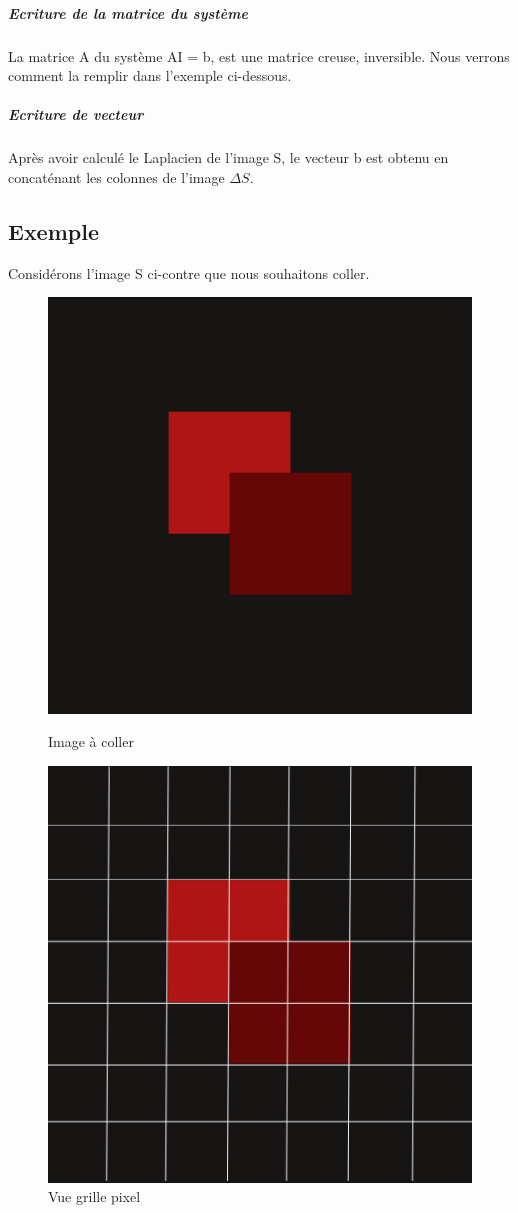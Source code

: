 \subparagraph{Ecriture de la matrice du système}
La matrice A du système AI = b, est une matrice creuse, inversible. Nous verrons comment la remplir dans l'exemple ci-dessous.

\subparagraph{Ecriture de vecteur}
Après avoir calculé le Laplacien de l'image S, le vecteur b est obtenu en concaténant les colonnes de l'image $\Delta S$. 

\subsection{Exemple}
Considérons l'image S ci-contre que nous souhaitons coller. 
\begin{figure}[!h]
\centering
\includegraphics[scale=0.1]{Images/square.png}
\caption{Image à coller}
\includegraphics[scale=0.1]{Images/pix.png}
\caption{Vue grille pixel}
\end{figure}
